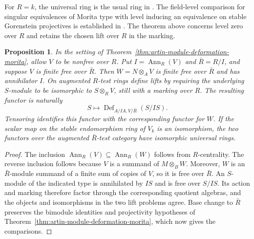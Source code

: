 \documentclass[12pt,a4paper,english,reqno]{amsart}
\numberwithin{equation}{section}
\theoremstyle{plain}
\newtheorem{proposition}[theorem]{Proposition}
\theoremstyle{definition}
\begin{document}
For $R=k$, the universal ring is the usual ring in
\cite{BekkertGiraldoVelez2020}. The field-level comparison for
singular equivalences of Morita type with level inducing an
equivalence on stable Gorenstein projectives is established in
\cite{PanVelez2026}. The theorem above concerns level zero over
$R$ and retains the chosen lift over $R$ in the marking.

\begin{proposition}\label{prop:module-deformation-effective-base}
In the setting of Theorem~\ref{thm:artin-module-deformation-morita},
allow $V$ to be nonfree over $R$. Put $I=\operatorname{Ann}_R(V)$
and $\bar R=R/I$, and suppose $V$ is finite free over $\bar R$.
Then $W=N\otimes_A V$ is finite free over $\bar R$ and has
annihilator $I$. On augmented $R$-test rings define lifts by
requiring the underlying $S$-module to be isomorphic to
$S\otimes_R V$, still with a marking over $R$. The resulting
functor is naturally
\[
  S\longmapsto \operatorname{Def}_{A/IA,V/\bar R}(S/IS).
\]
Tensoring identifies this functor with the corresponding
functor for $W$. If the scalar map on the stable endomorphism
ring of $V_k$ is an isomorphism, the two functors over the
augmented $\bar R$-test category have isomorphic universal
rings.
\end{proposition}

\begin{proof}
The inclusion $\operatorname{Ann}_R(V)\subseteq
\operatorname{Ann}_R(W)$ follows from $R$-centrality. The
reverse inclusion follows because $V$ is a summand of
$M\otimes_B W$. Moreover, $W$ is an $\bar R$-module summand
of a finite sum of copies of $V$, so it is free over
$\bar R$. An $S$-module of the indicated type is annihilated
by $IS$ and is free over $S/IS$. Its action and marking
therefore factor through the corresponding quotient
algebras, and the objects and isomorphisms in the two
lift problems agree. Base change to $\bar R$ preserves the
bimodule identities and projectivity hypotheses of
Theorem~\ref{thm:artin-module-deformation-morita}, which now
gives the comparisons.
\end{proof}
\end{document}
